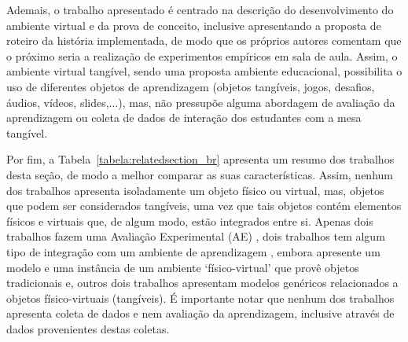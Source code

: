 Ademais, o trabalho apresentado é centrado na descrição do desenvolvimento do ambiente virtual e da prova de conceito, inclusive apresentando a proposta de roteiro da história implementada, de modo que os próprios autores comentam que o próximo seria a realização de experimentos empíricos em sala de aula. Assim, o ambiente virtual tangível, sendo uma proposta ambiente educacional, possibilita o uso de diferentes objetos de aprendizagem (objetos tangíveis, jogos, desafios, áudios, vídeos, slides,...), mas, não pressupõe alguma abordagem de avaliação da aprendizagem ou coleta de dados de interação dos estudantes com a mesa tangível.


Por fim, a Tabela~\ref{tabela:relatedsection_br} apresenta um resumo dos trabalhos desta seção, de modo a melhor comparar as suas características. Assim, nenhum dos trabalhos apresenta isoladamente um objeto físico ou virtual, mas, objetos que podem ser considerados tangíveis, uma vez que tais objetos contém elementos físicos e virtuais que, de algum modo, estão integrados entre si. Apenas dois trabalhos fazem uma Avaliação Experimental (AE) \citep{imamura:2018,lima:2016}, dois trabalhos tem algum tipo de integração com um ambiente de aprendizagem \citep{santos:2014ambientes, gluz:2018}, embora \cite{santos:2014ambientes} apresente um modelo e uma instância de um ambiente `físico-virtual' que provê objetos tradicionais e, outros dois trabalhos \citep{santos:2014ambientes,lima:2016} apresentam modelos genéricos relacionados a objetos físico-virtuais (tangíveis). É importante notar que nenhum dos trabalhos apresenta coleta de dados e nem avaliação da aprendizagem, inclusive através de dados provenientes destas coletas.

